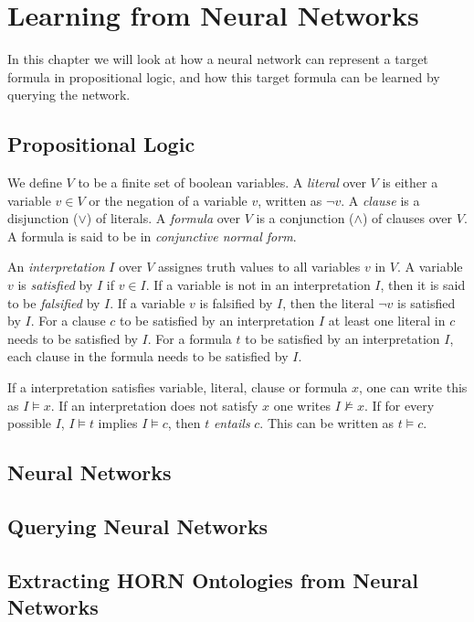 \chapter{Learning from Neural Networks}

In this chapter we will look at how a neural network can represent a target formula in propositional logic, and how this target formula can be learned by querying the network.

\section{Propositional Logic}
We define $V$ to be a finite set of boolean variables. A \emph{literal} over $V$ is either a variable $v \in V$ or the negation of a variable $v$, written as $\neg v$. A \emph{clause} is a disjunction ($\vee$) of literals. A \emph{formula} over $V$ is a conjunction ($\wedge$) of clauses over $V$. A formula is said to be in \emph{conjunctive normal form}.

An \emph{interpretation} $I$ over $V$ assignes truth values to all variables $v$ in $V$. A variable $v$ is \emph{satisfied} by $I$ if $v \in I$. If a variable is not in an interpretation $I$, then it is said to be \emph{falsified} by $I$. If a variable $v$ is falsified by $I$, then the literal $\neg v$ is satisfied by $I$. For a clause $c$ to be satisfied by an interpretation $I$ at least one literal in $c$ needs to be satisfied by $I$. For a formula $t$ to be satisfied by an interpretation $I$, each clause in the formula needs to be satisfied by $I$.

If a interpretation satisfies variable, literal, clause or formula $x$, one can write this as $I \models x$. If an interpretation does not satisfy $x$ one writes $ I \not \models x $. If for every possible $I$, $I \models t$ implies $I \models c$, then $t$ \emph{entails} $c$. This can be written as $t \models c$.


\section{Neural Networks}

\section{Querying Neural Networks}

\section{Extracting HORN Ontologies from Neural Networks}